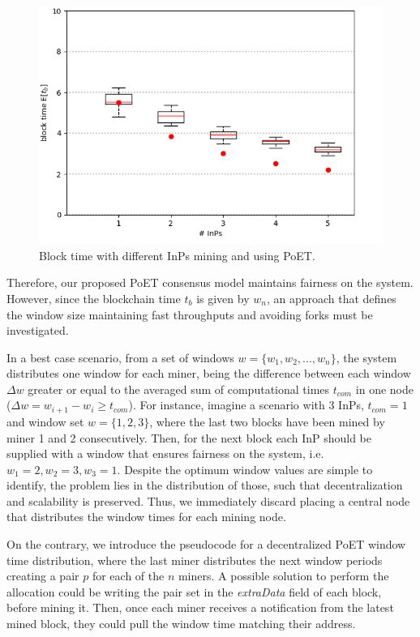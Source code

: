 \begin{figure}[bth]
	\centering
	\includegraphics[scale=0.7]{gfx/ev_block_time.png}    
  	\caption{Block time with different InPs mining and using PoET.}
  	\label{fig:block_time}
\end{figure}
  
  
Therefore, our proposed PoET consensus model maintains fairness on the system. However, since the blockchain time $t_b$ is given by $w_n$, an approach that defines the window size maintaining fast throughputs and avoiding forks must be investigated. 

In a best case scenario, from a set of windows $w = \{w_1,w_2,...,w_n\}$, the system distributes one window for each miner, being the difference between each window $\Delta w$ greater or equal to the averaged sum of computational times $t_{com}$ in one node ($\Delta w = w_{i+1} - w_i \geq t_{com} $). For instance, imagine a scenario with 3 InPs, $t_{com} = 1$ and window set $w = \{1,2,3\}$, where the last two blocks have been mined by miner 1 and 2 consecutively. Then, for the next block each InP should be supplied with a window that ensures fairness on the system, i.e. $w_1 = 2, w_2 = 3, w_3 = 1$. Despite the optimum window values are simple to identify, the problem lies in the distribution of those, such that decentralization and scalability is preserved. Thus, we immediately discard placing a central node that distributes the window times for each mining node.

On the contrary, we introduce the pseudocode for a decentralized PoET window time distribution, where the last miner distributes the next window periods creating a pair $p$ for each of the $n$ miners. A possible solution to perform the allocation could be writing the pair set in the \textit{extraData} field of each block, before mining it. Then, once each miner receives a notification from the latest mined block, they could pull the window time matching their address.

